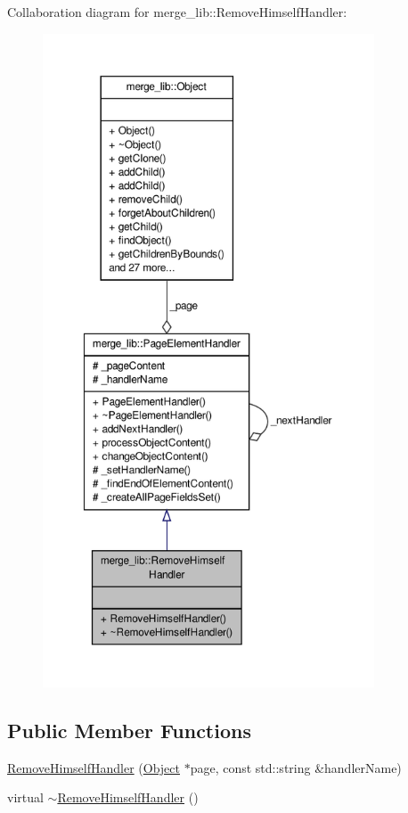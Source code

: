 Collaboration diagram for merge\-\_\-lib\-:\-:Remove\-Himself\-Handler\-:
\nopagebreak
\begin{figure}[H]
\begin{center}
\leavevmode
\includegraphics[height=550pt]{df/da5/classmerge__lib_1_1_remove_himself_handler__coll__graph}
\end{center}
\end{figure}
\subsection*{Public Member Functions}
\begin{DoxyCompactItemize}
\item 
\hyperlink{classmerge__lib_1_1_remove_himself_handler_a1186fc0fd7f6e18bab613b5dd1108d09}{Remove\-Himself\-Handler} (\hyperlink{classmerge__lib_1_1_object}{Object} $\ast$page, const std\-::string \&handler\-Name)
\item 
virtual \hyperlink{classmerge__lib_1_1_remove_himself_handler_a0857516cc05b051d0e3cd97429fc898b}{$\sim$\-Remove\-Himself\-Handler} ()
\end{DoxyCompactItemize}
